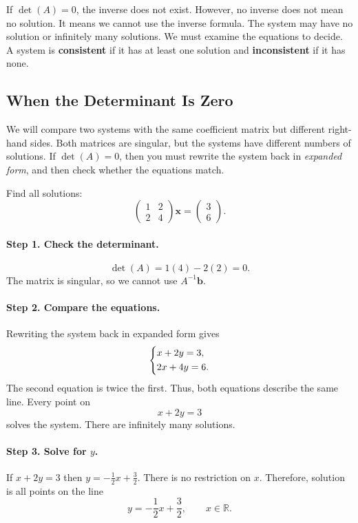 \documentclass[10pt,letterpaper]{article}
\begin{document}
If $\det(A)=0$, the inverse does not exist.
However, no inverse does not mean no solution.
It means we cannot use the inverse formula.
The system may have no solution or infinitely many
solutions. We must examine the equations to decide.
A system is \textbf{consistent} if it has at least
one solution and \textbf{inconsistent} if it has none.

\subsection{When the Determinant Is Zero}

We will compare two systems with the same coefficient
matrix but different right-hand sides. Both matrices
are singular, but the systems have different numbers
of solutions. If $\det(A)=0$, then you must rewrite the system back in \textit{expanded form}, and then check whether the equations match.

\begin{example}[8]{
Find all solutions:
\[
\begin{pmatrix}
1&2\\
2&4
\end{pmatrix}
\mathbf{x}
=
\begin{pmatrix}3\\6\end{pmatrix}.
\]
}
\paragraph{Step 1. Check the determinant.}
\[
\det(A)=1(4)-2(2)=0.
\]
The matrix is singular, so we cannot use
$A^{-1}\mathbf{b}$.

\paragraph{Step 2. Compare the equations.}
Rewriting the system back in expanded form gives
\[
\begin{dcases}
x+2y=3,\\
2x+4y=6.
\end{dcases}
\]
The second equation is twice the first.
Thus, both equations describe the same line.
Every point on
\[
\boxed{x+2y=3}
\]
solves the system. There are infinitely many solutions.

\paragraph{Step 3. Solve for $y$.} If $x+2y=3$ then $y=-\tfrac{1}{2}x+\tfrac{3}{2}$. There is no restriction on $x$. Therefore, solution is all points on the line
\[
\boxed{
y=-\frac{1}{2}x+\frac{3}{2},
\qquad x\in\mathbb R.
}
\]
\end{example}
\end{document}
